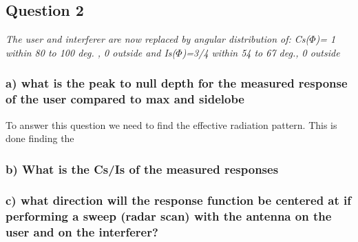 \subsection{Question 2}
\textit{The user and interferer are now replaced by angular distribution of: Cs($\Phi$)= 1 within 80 to 100 deg. , 0 outside and Is($\Phi$)=3/4 within 54 to 67 deg., 0 outside}

\subsubsection{a) what is the peak to null depth for the measured response of the user compared to max and sidelobe}

To answer this question we need to find the effective radiation pattern. This is done finding the 

\subsubsection{b) What is the Cs/Is of the measured responses}

\subsubsection{c) what direction will the response function be centered at if performing a sweep (radar scan) with the antenna on the user and on the interferer?}